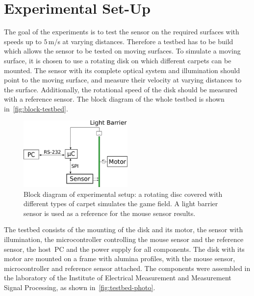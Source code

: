 \documentclass[12pt,a4paper]{article}
\newcommand{\EMT}{Institute of Electrical Measurement and Measurement Signal Processing}
\begin{document}
\newpage
\section{Experimental Set-Up}

The goal of the experiments is to test the sensor on the required surfaces with speeds up to $5\,$m/s at varying distances.
Therefore a testbed has to be build which allows the sensor to be tested on moving surfaces.
To simulate a moving surface, it is chosen to use a rotating disk on which different carpets can be mounted.
The sensor with its complete optical system and illumination should point to the moving surface, and measure their velocity at varying distances to the surface.
Additionally, the rotational speed of the disk should be measured with a reference sensor.
The block diagram of the whole testbed is shown in~\autoref{fig:block-testbed}.

\begin{figure}[htbp]
\begin{center}
\includegraphics[width=0.5\textwidth]{figures/block_diagram-testbed.pdf}
\caption{\label{fig:block-testbed}
Block diagram of experimental setup: a rotating disc covered with different types of carpet simulates the game field. 
A light barrier sensor is used as a reference for the mouse sensor results.
}
\end{center}
\end{figure}

The testbed consists of the mounting of the disk and its motor, the sensor with illumination, the microcontroller controlling the mouse sensor and the reference sensor, the host~PC and the power supply for all components.
The disk with its motor are mounted on a frame with alumina profiles, with the mouse sensor, microcontroller and reference sensor attached.
The components were assembled in the laboratory of the \EMT, as shown in~\autoref{fig:testbed-photo}.
\end{document}
